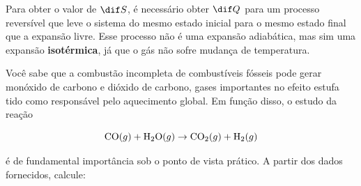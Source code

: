 \documentclass{IMTexam}
\begin{document}
\begin{questions}
\begin{parts}
\begin{solution}
                Para obter o valor de $\dif S$, é necessário obter $\dif Q$ para um
                processo reversível que leve o sistema do mesmo estado inicial
                para o mesmo estado final que a expansão livre. Esse processo
                não é uma expansão adiabática, mas sim uma expansão
                \textbf{isotérmica}, já que o gás não sofre mudança de
                temperatura.
            \end{solution}

        \end{parts}

        \question Você sabe que a combustão incompleta de combustíveis fósseis
        pode gerar monóxido de carbono e dióxido de carbono, gases importantes
        no efeito estufa tido como responsável pelo aquecimento global. Em
        função disso, o estudo da reação

        \[ \ce{CO}(g) + \ce{H2O}(g) \rightarrow \ce{CO2}(g) + \ce{H2}(g) \]

        é de fundamental importância sob o ponto de vista prático. A partir dos dados
        fornecidos, calcule:

\end{questions}
\end{document}
